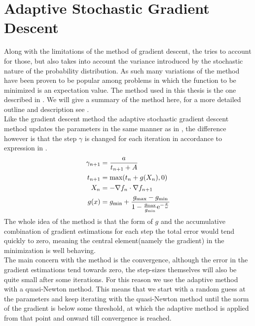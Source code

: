 \section{Adaptive Stochastic Gradient
Descent\label{sec:adaptive_stochastic_gradient_descent}}
    Along with the limitations of the method of gradient descent, the
     tries to account for those,
    but also takes into account the variance introduced by the stochastic
    nature of the probability distribution. As such many variations of the
    method have been proven to be popular among problems in which the function
    to be minimized is an expectation value. The method used in this thesis is
    the one described in \cite{ASGD}. We will give a summary of the method
    here, for a more detailed outline and description see \cite{ASGD}. \\

    Like the gradient descent method the adaptive stochastic gradient descent
    method updates the parameters in the same manner as in ,
    the difference however is that the step $\gamma$ is changed for each
    iteration in accordance to expression in .
        \begin{equation}
            \begin{aligned}
                \gamma_{n+1} &= \frac{a}{t_{n+1} + A} \\
                t_{n+1} &= \text{max}(t_n + g(X_n), 0) \\
                X_n &= - \nabla f_n \cdot \nabla f_{n+1} \\
                g(x) &= g_{\text{min}} + \frac{g_{\text{max}} -
                g_{\text{min}}}{1 - \frac{g_{\text{max}}}{g_{\text{min}}}
                \mathrm{e}^{-\frac{x}{\omega}}}
            \end{aligned}
            \label{eq:ASGDDEF}
        \end{equation}
    The whole idea of the method is that the form of $g$ and the accumulative
    combination of gradient estimations for each step the total error would
    tend quickly to zero, meaning the central element(namely the gradient) in
    the minimization is well behaving. \\

    The main concern with the method is the convergence, although the error in
    the gradient estimations tend towards zero, the step-sizes themselves will
    also be quite small after some iterations. For this reason we use the
    adaptive method with a quasi-Newton method. This means that we start with a
    random guess at the parameters and keep iterating with the quasi-Newton
    method until the norm of the gradient is below some threshold, at which the
    adaptive method is applied from that point and onward till convergence is
    reached.

